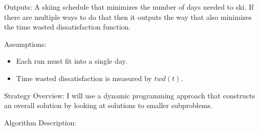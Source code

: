 \documentclass{article}
\begin{document}
Outputs: A skiing schedule that minimizes the number of days needed to ski. If there are multiple ways to do that then it outputs the way that also minimizes the time wasted dissatisfaction function.

Assumptions:
\begin{itemize}
    \item Each run must fit into a single day.
    \item Time wasted dissatisfaction is measured by $twd(t)$. 
\end{itemize}

Strategy Overview:
I will use a dynamic programming approach that constructs an overall solution by looking at solutions to smaller subproblems.

Algorithm Description:
\begin{lstlisting}
\end{lstlisting}
\end{document}
